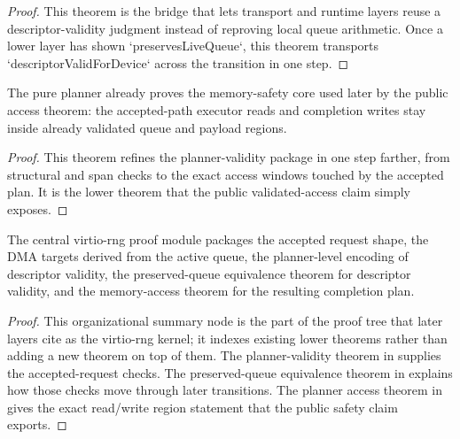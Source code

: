 \begin{proof}
\leanok
{}
This theorem is the bridge that lets transport and runtime layers reuse a descriptor-validity judgment instead of reproving local queue arithmetic.
Once a lower layer has shown `preservesLiveQueue`, this theorem transports `descriptorValidForDevice` across the transition in one step.
\end{proof}

\begin{theorem}
\label{thm:planner-access-kernel}
\leanok
The pure planner already proves the memory-safety core used later by the public access theorem: the accepted-path executor reads and completion writes stay inside already validated queue and payload regions.
\end{theorem}

\begin{proof}
\leanok
{}
This theorem refines the planner-validity package in  one step farther, from structural and span checks to the exact access windows touched by the accepted plan.
It is the lower theorem that the public validated-access claim simply exposes.
\end{proof}

\begin{theorem}
\label{thm:rng-proof-kernel}
\leanok
The central virtio-rng proof module packages the accepted request shape, the DMA targets derived from the active queue, the planner-level encoding of descriptor validity, the preserved-queue equivalence theorem for descriptor validity, and the memory-access theorem for the resulting completion plan.
\end{theorem}

\begin{proof}
\leanok
{}
This organizational summary node is the part of the proof tree that later layers cite as the virtio-rng kernel; it indexes existing lower theorems rather than adding a new theorem on top of them.
The planner-validity theorem in  supplies the accepted-request checks.
The preserved-queue equivalence theorem in  explains how those checks move through later transitions.
The planner access theorem in  gives the exact read/write region statement that the public safety claim exports.
\end{proof}

